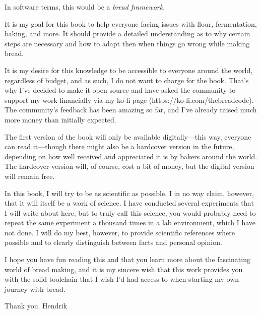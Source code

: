 In software terms, this would be a {\it bread framework}.

It is my goal for this book to help everyone facing issues with flour, fermentation, baking,
and more. It should provide a detailed understanding as to why certain steps are necessary
and how to adapt then when things go wrong while making bread.

It is my desire for this knowledge to be accessible to everyone around the world, regardless
of budget, and as such, I do not want to charge for the book. That's why I've decided to make
it open source and have asked the community to support my work financially via my ko-fi page
(https://ko-fi.com/thebreadcode). The community's feedback has been amazing so far, and
I've already raised much more money than initially expected.

The first version of the book will only be available digitally---this way, everyone can read
it---though there might also be a hardcover version in the future, depending on how well received
and appreciated it is by bakers around the world. The hardcover version will, of course, cost a
bit of money, but the digital version will remain free.

In this book, I will try to be as scientific as possible. I in no way claim, however, that
it will itself be a work of science. I have conducted several experiments that I will write
about here, but to truly call this science, you would probably need to repeat the same experiment
a thousand times in a lab environment, which I have not done. I will do my best, however, to provide
scientific references where possible and to clearly distinguish between facts and personal opinion.

I hope you have fun reading this and that you learn more about the fascinating world of bread
making, and it is my sincere wish that this work provides you with the solid toolchain that I wish
I'd had access to when starting my own journey with bread.

Thank you.
Hendrik
